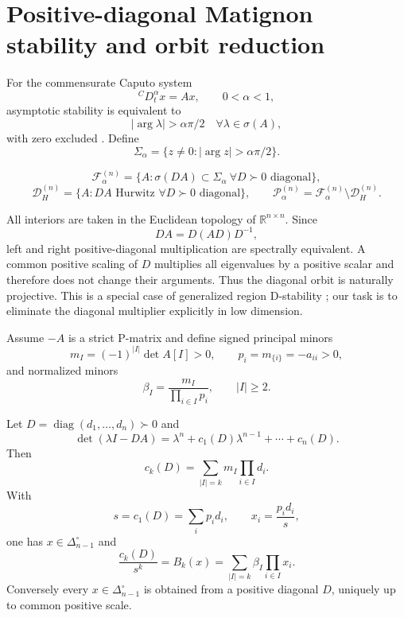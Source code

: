 \section{Positive-diagonal Matignon stability and orbit reduction}
\label{sec:framework}

For the commensurate Caputo system
\[
{}^C D_t^\alpha x=Ax,\qquad 0<\alpha<1,
\]
asymptotic stability is equivalent to
\[
|\arg\lambda|>\alpha\pi/2
\quad\forall\lambda\in\sigma(A),
\]
with zero excluded \cite{Matignon1996,BrandiburGarrappaKaslik2021}. Define
\[
\Sigma_\alpha=\{z\neq0:|\arg z|>\alpha\pi/2\}.
\]

\begin{definition}
\[
\mathcal F_\alpha^{(n)}
=
\{A:\sigma(DA)\subset\Sigma_\alpha\ \forall D\succ0\text{ diagonal}\},
\]
\[
\mathcal D_H^{(n)}
=
\{A:DA\text{ Hurwitz }\forall D\succ0\text{ diagonal}\},
\qquad
\mathcal P_\alpha^{(n)}
=
\mathcal F_\alpha^{(n)}\setminus\mathcal D_H^{(n)}.
\]
\end{definition}

All interiors are taken in the Euclidean topology of \(\mathbb R^{n\times n}\). Since
\[
DA=D(AD)D^{-1},
\]
left and right positive-diagonal multiplication are spectrally equivalent. A common positive scaling of \(D\) multiplies all eigenvalues by a positive scalar and therefore does not change their arguments. Thus the diagonal orbit is naturally projective. This is a special case of generalized region D-stability \cite{Kushel2019,KushelPavani2022}; our task is to eliminate the diagonal multiplier explicitly in low dimension.

Assume \(-A\) is a strict P-matrix and define signed principal minors
\[
m_I=(-1)^{|I|}\det A[I]>0,
\qquad
p_i=m_{\{i\}}=-a_{ii}>0,
\]
and normalized minors
\[
\beta_I=\frac{m_I}{\prod_{i\in I}p_i},
\qquad |I|\ge2.
\]

\begin{lemma}
\label{lem:simplex-reduction}
Let \(D=\operatorname{diag}(d_1,\dots,d_n)\succ0\) and
\[
\det(\lambda I-DA)
=
\lambda^n+c_1(D)\lambda^{n-1}+\cdots+c_n(D).
\]
Then
\[
c_k(D)=\sum_{|I|=k}m_I\prod_{i\in I}d_i.
\]
With
\[
s=c_1(D)=\sum_i p_i d_i,
\qquad
x_i=\frac{p_i d_i}{s},
\]
one has \(x\in\Delta_{n-1}^\circ\) and
\[
\frac{c_k(D)}{s^k}
=
B_k(x)
=
\sum_{|I|=k}\beta_I\prod_{i\in I}x_i.
\]
Conversely every \(x\in\Delta_{n-1}^\circ\) is obtained from a positive diagonal \(D\), uniquely up to common positive scale.
\end{lemma}

